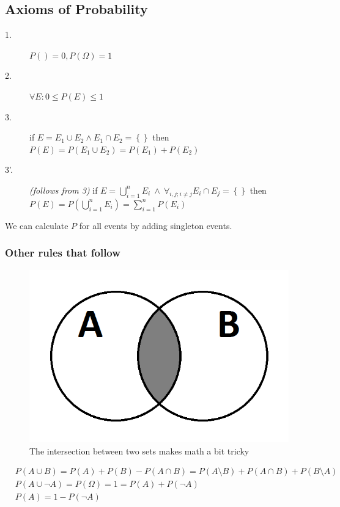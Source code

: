 \subsection{Axioms of Probability}
\begin{description}
	\item[1.] $P({}) = 0, P(\Omega) = 1$
  \item[2.] $\forall E: 0 \leq P(E) \leq 1$
  \item[3.] if $E = E_1 \cup E_2 \wedge E_1 \cap E_2 = \left\{ \right\}$ 
            then $P(E) = P(E_1 \cup E_2) = P(E_1) + P(E_2)$
  \item[3'.] \textit{(follows from 3)} 
            if $E = \bigcup_{i=1}^n E_i \  \wedge \ \forall_{i, j; i \neq j} E_i \cap E_j = \left\{ \right\}$
            then $P(E) = P(\bigcup_{i=1}^n E_i) = \sum_{i=1}^{n}{P(E_i)}$
\end{description}

We can calculate $P$ for all events by adding singleton events.

\subsubsection*{Other rules that follow}
\begin{figure}[ht]
\includegraphics[scale=0.2]{venn_diagram_a_intersects_b}
\caption{The intersection between two sets makes math a bit tricky}
\label{fig:venn_a_inter_b}
\end{figure}

\begin{align}
& P(A \cup B) = P(A) + P(B) - P(A \cap B) = P(A \setminus B) + P(A \cap B) + P(B \setminus A)\\
& P(A \cup \neg A) = P(\Omega) = 1 = P(A) + P(\neg A)\\
& P(A) = 1- P(\neg A)
\end{align}



